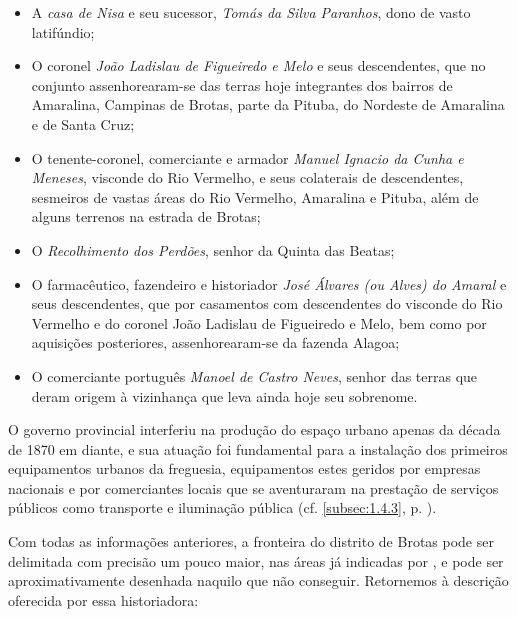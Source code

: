 \begin{itemize}
\item A \textit{casa de Nisa} e seu sucessor, \textit{Tomás da Silva Paranhos}, dono de vasto latifúndio;
\item O coronel \textit{João Ladislau de Figueiredo e Melo} e seus descendentes, que no conjunto assenhorearam-se das terras hoje integrantes dos bairros de Amaralina, Campinas de Brotas, parte da Pituba, do Nordeste de Amaralina e de Santa Cruz; 
\item O tenente-coronel, comerciante e armador \textit{Manuel Ignacio da Cunha e Meneses}, visconde do Rio Vermelho, e seus colaterais de descendentes, sesmeiros de vastas áreas do Rio Vermelho, Amaralina e Pituba, além de alguns terrenos na estrada de Brotas;
\item O \textit{Recolhimento dos Perdões}, senhor da Quinta das Beatas;
\item O farmacêutico, fazendeiro e historiador \textit{José Álvares (ou Alves) do Amaral} e seus descendentes, que por casamentos com descendentes do visconde do Rio Vermelho e do coronel João Ladislau de Figueiredo e Melo, bem como por aquisições posteriores, assenhorearam-se da fazenda Alagoa;
\item O comerciante português \textit{Manoel de Castro Neves}, senhor das terras que deram origem à vizinhança que leva ainda hoje seu sobrenome.
\end{itemize}

O governo provincial interferiu na produção do espaço urbano apenas da década de 1870 em diante, e sua atuação foi fundamental para a instalação dos primeiros equipamentos urbanos da freguesia, equipamentos estes geridos por empresas nacionais e por comerciantes locais que se aventuraram na prestação de serviços públicos como transporte e iluminação pública (cf. \autoref{subsec:1.4.3}, p. \pageref{subsec:1.4.3}).

Com todas as informações anteriores, a fronteira do distrito de Brotas pode ser delimitada com precisão um pouco maior, nas áreas já indicadas por , e pode ser aproximativamente desenhada naquilo que  não conseguir. Retornemos à descrição oferecida por essa historiadora:


